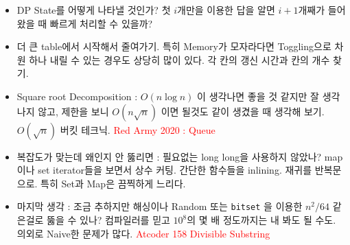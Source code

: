 \documentclass[landscape,8pt]{article}
\begin{document}
\begin{multicols}{2}
\begin{itemize}
      \item DP State를 어떻게 나타낼 것인가? 첫 $i$개만을 이용한 답을 알면 $i+1$개째가 들어왔을 때 빠르게 처리할 수 있을까?
      \item 더 큰 table에서 시작해서 줄여가기. 특히 Memory가 모자라다면 Toggling으로 차원 하나 내릴 수 있는 경우도 상당히 많이 있다. 각 칸의 갱신 시간과 칸의 개수 찾기.
      \item Square root Decomposition : $O(n \log n)$ 이 생각나면 좋을 것 같지만 잘 생각나지 않고, 제한을 보니 $O(n \sqrt{n})$ 이면 될것도 같이 생겼을 때 생각해 보기. $O(\sqrt{n})$ 버킷 테크닉. \textcolor{red}{Red Army 2020 : Queue}
      \item 복잡도가 맞는데 왜인지 안 뚫리면 : 필요없는 long long을 사용하지 않았나? map이나 set iterator들을 보면서 상수 커팅. 간단한 함수들을 inlining. 재귀를 반복문으로. 특히 Set과 Map은 끔찍하게 느리다.
      \item 마지막 생각 : 조금 추하지만 해싱이나 Random 또는 \texttt{bitset} 을 이용한 $n^2 / 64$ 같은걸로 뚫을 수 있나? 컴파일러를 믿고 $10^8$의 몇 배 정도까지는 내 봐도 될 수도. 의외로 Naive한 문제가 많다. \textcolor{red}{Atcoder 158 Divisible Substring}
    \end{itemize}

\end{multicols}
\end{document}
